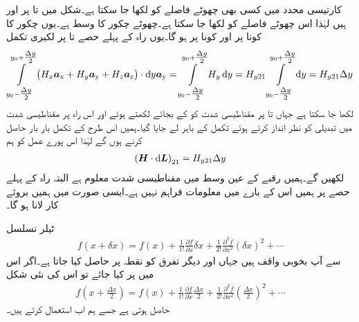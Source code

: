 کارتیسی محدد میں کسی بھی چھوٹے فاصلے کو  لکھا جا سکتا ہے۔شکل  میں  تا  پر  اور  ہیں لہٰذا اس چھوٹے فاصلے کو  لکھا جا سکتا ہے۔چھوٹے چکور کا وسط  ہے۔یوں چکور کا  کونا  پر اور  کونا  پر ہو گا۔یوں راہ کے پہلے حصے  تا  پر لکیری تکمل
\begin{align*}
\int\limits_{y_0-\tfrac{\Delta y}{2}}^{y_0+\tfrac{\Delta y}{2}}\left(H_x \ax+H_y\ay+H_z\az \right) \cdot \dif y \ay=\int\limits_{y_0-\tfrac{\Delta y}{2}}^{y_0+\tfrac{\Delta y}{2}}H_y  \dif y =H_{y21}\int\limits_{y_0-\tfrac{\Delta y}{2}}^{y_0+\tfrac{\Delta y}{2}}  \dif y=H_{y21}\Delta y
\end{align*}
لکھا جا سکتا ہے جہاں  تا  پر مقناطیسی شدت کو  کے بجائے  لکھتے ہوئے اور اس راہ پر مقناطیسی شدت میں تبدیلی کو نظر انداز کرتے ہوئے  تکمل کے باہر لے جایا گیا۔ہمیں اس طرح کے تکمل بار بار حاصل کرنے ہوں گے لہٰذا اس پورے عمل کو ہم
\begin{align}\label{مساوات_مقناطیسی_پہلے_حصہ_تکمل}
\left( \kvec{H} \cdot \dif \kvec{L}\right)_{21}=H_{y21} \Delta y 
\end{align}
لکھیں گے۔ہمیں رقبے کے عین وسط میں مقناطیسی شدت معلوم ہے البتہ راہ کے پہلے حصے پر ہمیں اس کے بارے میں معلومات فراہم نہیں ہے۔ایسی صورت میں ہمیں  بروئے کار لانا ہو گا۔

ٹیلر تسلسل
\begin{align*}
f(x+\delta x)=f(x)+\frac{1}{1!}\frac{\partial f}{\partial x} \delta x + \frac{1}{2!}\frac{\partial^2 f}{\partial x^2} (\delta x)^2+\cdots
\end{align*}
سے آپ بخوبی واقف ہیں جہاں  اور دیگر تفرق کو نقطہ  پر حاصل کیا جاتا ہے۔اگر اس میں  پر کیا جائے تو اس کی نئی شکل
\begin{align*}
f(x+\tfrac{\Delta x}{2})=f(x)+\frac{1}{1!}\frac{\partial f}{\partial x} \frac{\Delta x}{2} + \frac{1}{2!}\frac{\partial^2 f}{\partial x^2} \left(\frac{\Delta x}{2}\right)^2+\cdots
\end{align*}
حاصل ہوتی ہے جسے ہم اب استعمال کرتے ہیں۔


